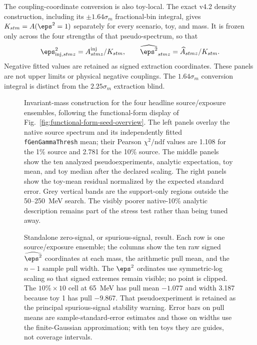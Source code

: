 {The coupling-coordinate conversion is also toy-local.  The exact v4.2 density
construction, including its $\pm1.64\sigma_m$ fractional-bin integral, gives
$K_{stm}=A(\eps^2=1)$ separately for every scenario, toy, and mass.  It is frozen
only across the four strengths of that pseudo-spectrum, so that
\begin{equation}
 \eps^2_{\mathrm{inj},stmz}=A^{\mathrm{inj}}_{stmz}/K_{stm},
 \qquad
 \widehat{\eps^2}_{stmz}=\widehat A_{stmz}/K_{stm}.
 \label{eq:v4p5-eps2-coordinate}
\end{equation}
Negative fitted values are retained as signed extraction coordinates.  These panels
are not upper limits or physical negative couplings.  The $1.64\sigma_m$ conversion
integral is distinct from the $2.25\sigma_m$ extraction blind.

\begin{figure}[p]
\centering
{}
\caption{Invariant-mass construction for the four headline source/exposure
ensembles, following the functional-form display of
Fig.~\ref{fig:functional-form-seed-overview}.
The left panels overlay the native source spectrum and its independently fitted
\texttt{fGenGammaThresh} mean; their Pearson $\chi^2/\mathrm{ndf}$ values are 1.108
for the 1\% source and 2.781 for the 10\% source.  The middle panels show the ten
analyzed pseudoexperiments, analytic expectation, toy mean, and toy median after the
declared scaling.  The right panels show the toy-mean residual normalized by the
expected standard error.  Grey vertical bands are the support-only regions outside
the 50--250~MeV search.  The visibly poorer native-10\% analytic description remains
part of the stress test rather than being tuned away.}
\label{fig:v4p5-functional-form-exposure-distributions}
\end{figure}

\begin{figure}[p]
\centering
{}
\caption{Standalone zero-signal, or spurious-signal, result.  Each row is one
source/exposure ensemble; the columns show the ten raw signed
$\widehat{\eps^2}$ coordinates at each mass, the arithmetic pull mean, and the
$n-1$ sample pull width.  The $\eps^2$ ordinates use symmetric-log scaling so that
signed extremes remain visible; no point is clipped.  The $10\%\times10$ cell at
65~MeV has pull mean $-1.077$ and width 3.187 because toy 1 has pull $-9.867$.
That pseudoexperiment is retained as the principal spurious-signal stability
warning.  Error bars on pull means are sample-standard-error estimates and those on
widths use the finite-Gaussian approximation; with ten toys they are guides, not
coverage intervals.}
\label{fig:v4p5-zero-signal-spurious}
\end{figure}

}
